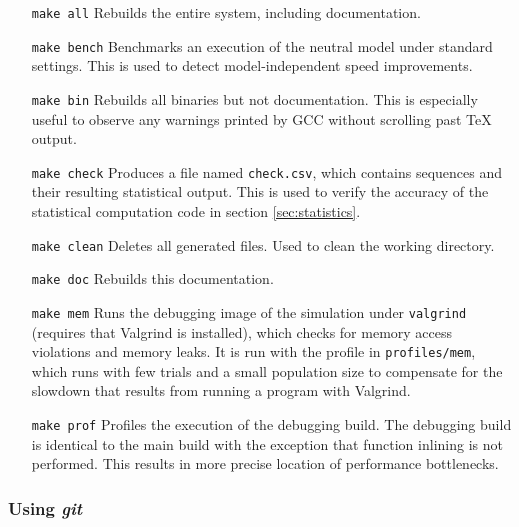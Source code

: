 \documentclass{article}
\begin{document}
        \begin{enumerate}
          \item[\tt make all]
          Rebuilds the entire system, including documentation.

	  \item[\tt make bench]
	  Benchmarks an execution of the neutral model under standard settings.
	  This is used to detect model-independent speed improvements.

          \item[\tt make bin]
          Rebuilds all binaries but not documentation. This is especially useful
          to observe any warnings printed by GCC without scrolling past \TeX{}
          output.

	  \item[\tt make check]
	  Produces a file named \verb|check.csv|, which contains sequences and
	  their resulting statistical output. This is used to verify the
	  accuracy of the statistical computation code in section
	  \ref{sec:statistics}.

	  \item[\tt make clean]
	  Deletes all generated files. Used to clean the working directory.

          \item[\tt make doc]
          Rebuilds this documentation.

          \item[\tt make mem]
          Runs the debugging image of the simulation under \verb|valgrind|
          (requires that Valgrind is installed), which checks for memory access
          violations and memory leaks. It is run with the profile in
          \verb|profiles/mem|, which runs with few trials and a small population
          size to compensate for the slowdown that results from running a
          program with Valgrind.

          \item[\tt make prof]
          Profiles the execution of the debugging build. The debugging build is
          identical to the main build with the exception that function inlining
          is not performed. This results in more precise location of performance
          bottlenecks.
        \end{enumerate}

      \subsubsection{Using {\em git}}
        \label{sec:git}
\end{document}
